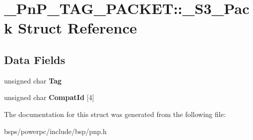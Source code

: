 \hypertarget{struct__PnP__TAG__PACKET_1_1__S3__Pack}{}\section{\+\_\+\+Pn\+P\+\_\+\+T\+A\+G\+\_\+\+P\+A\+C\+K\+ET\+::\+\_\+\+S3\+\_\+\+Pack Struct Reference}
\label{struct__PnP__TAG__PACKET_1_1__S3__Pack}
\subsection*{Data Fields}
\begin{DoxyCompactItemize}
\item 
\mbox{\label{struct__PnP__TAG__PACKET_1_1__S3__Pack_a4b7d7d7725bdbc0c1c3077a7a4f00b8e}} 
unsigned char {\bfseries Tag}
\item 
\mbox{\label{struct__PnP__TAG__PACKET_1_1__S3__Pack_abe5f54251becf6feda10932499b835ee}} 
unsigned char {\bfseries Compat\+Id} \mbox{[}4\mbox{]}
\end{DoxyCompactItemize}


The documentation for this struct was generated from the following file\+:\begin{DoxyCompactItemize}
\item 
bsps/powerpc/include/bsp/pnp.\+h\end{DoxyCompactItemize}
